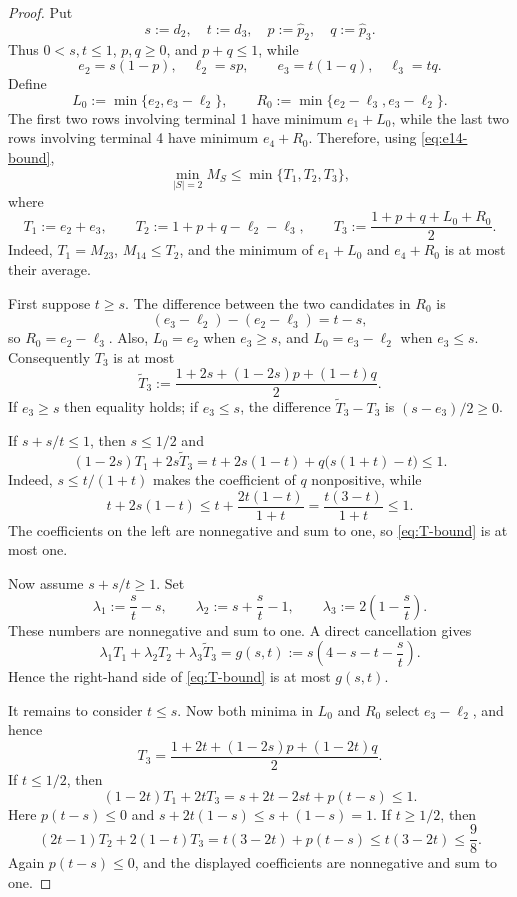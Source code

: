 \documentclass[11pt]{article}
\theoremstyle{remark}
\begin{document}
\begin{proof}
Put
\[
 s:=d_2,\quad t:=d_3,\quad p:=\widehat p_2,\quad q:=\widehat p_3.
\]
Thus $0<s,t\le1$, $p,q\ge0$, and $p+q\le1$, while
\[
 e_2=s(1-p),\quad \ell_2=sp,
 \qquad
 e_3=t(1-q),\quad \ell_3=tq.
\]
Define
\[
 L_0:=\min\{e_2,e_3-\ell_2\},
 \qquad
 R_0:=\min\{e_2-\ell_3,e_3-\ell_2\}.
\]
The first two rows involving terminal 1 have minimum $e_1+L_0$, while the
last two rows involving terminal 4 have minimum $e_4+R_0$.  Therefore,
using \eqref{eq:e14-bound},
\begin{equation}\label{eq:T-bound}
 \min_{|S|=2}M_S\le\min\{T_1,T_2,T_3\},
\end{equation}
where
\[
 T_1:=e_2+e_3,
 \qquad
 T_2:=1+p+q-\ell_2-\ell_3,
 \qquad
 T_3:=\frac{1+p+q+L_0+R_0}{2}.
\]
Indeed, $T_1=M_{23}$, $M_{14}\le T_2$, and the minimum of
$e_1+L_0$ and $e_4+R_0$ is at most their average.

First suppose $t\ge s$.  The difference between the two candidates in
$R_0$ is
\[
 (e_3-\ell_2)-(e_2-\ell_3)=t-s,
\]
so $R_0=e_2-\ell_3$.  Also,
$L_0=e_2$ when $e_3\ge s$, and $L_0=e_3-\ell_2$ when $e_3\le s$.
Consequently $T_3$ is at most
\[
 \widetilde T_3
 :=\frac{1+2s+(1-2s)p+(1-t)q}{2}.
\]
If $e_3\ge s$ then equality holds; if $e_3\le s$, the difference
$\widetilde T_3-T_3$ is $(s-e_3)/2\ge0$.

If $s+s/t\le1$, then $s\le1/2$ and
\[
 (1-2s)T_1+2s\widetilde T_3
 =t+2s(1-t)+q\bigl(s(1+t)-t\bigr)\le1.
\]
Indeed, $s\le t/(1+t)$ makes the coefficient of $q$ nonpositive, while
\[
 t+2s(1-t)\le t+\frac{2t(1-t)}{1+t}
 =\frac{t(3-t)}{1+t}\le1.
\]
The coefficients on the left are nonnegative and sum to one, so
\eqref{eq:T-bound} is at most one.

Now assume $s+s/t\ge1$.  Set
\[
 \lambda_1:=\frac{s}{t}-s,
 \qquad
 \lambda_2:=s+\frac{s}{t}-1,
 \qquad
 \lambda_3:=2\left(1-\frac{s}{t}\right).
\]
These numbers are nonnegative and sum to one.  A direct cancellation gives
\[
 \lambda_1T_1+\lambda_2T_2+\lambda_3\widetilde T_3
 =g(s,t):=s\left(4-s-t-\frac{s}{t}\right).
\]
Hence the right-hand side of \eqref{eq:T-bound} is at most $g(s,t)$.

It remains to consider $t\le s$.  Now both minima in $L_0$ and $R_0$ select
$e_3-\ell_2$, and hence
\[
 T_3=\frac{1+2t+(1-2s)p+(1-2t)q}{2}.
\]
If $t\le1/2$, then
\[
 (1-2t)T_1+2tT_3
 =s+2t-2st+p(t-s)\le1.
\]
Here $p(t-s)\le0$ and
$s+2t(1-s)\le s+(1-s)=1$.
If $t\ge1/2$, then
\[
 (2t-1)T_2+2(1-t)T_3
 =t(3-2t)+p(t-s)\le t(3-2t)\le\frac98.
\]
Again $p(t-s)\le0$, and the displayed coefficients are nonnegative and sum
to one.


\end{proof}
\end{document}
